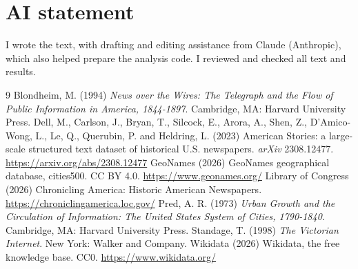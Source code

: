 \documentclass[11pt,a4paper]{article}
\begin{document}
\section*{AI statement}
I wrote the text, with drafting and editing assistance from Claude (Anthropic), which also helped prepare the analysis code. I reviewed and checked all text and results.

\begin{thebibliography}{9}
 Blondheim, M. (1994) \textit{News over the Wires: The Telegraph and the Flow of Public Information in America, 1844-1897}. Cambridge, MA: Harvard University Press.
 Dell, M., Carlson, J., Bryan, T., Silcock, E., Arora, A., Shen, Z., D'Amico-Wong, L., Le, Q., Querubin, P. and Heldring, L. (2023) American Stories: a large-scale structured text dataset of historical U.S. newspapers. \textit{arXiv} 2308.12477. \url{https://arxiv.org/abs/2308.12477}
 GeoNames (2026) GeoNames geographical database, cities500. CC BY 4.0. \url{https://www.geonames.org/}
 Library of Congress (2026) Chronicling America: Historic American Newspapers. \url{https://chroniclingamerica.loc.gov/}
 Pred, A. R. (1973) \textit{Urban Growth and the Circulation of Information: The United States System of Cities, 1790-1840}. Cambridge, MA: Harvard University Press.
 Standage, T. (1998) \textit{The Victorian Internet}. New York: Walker and Company.
 Wikidata (2026) Wikidata, the free knowledge base. CC0. \url{https://www.wikidata.org/}
\end{thebibliography}

\appendix
\end{document}
